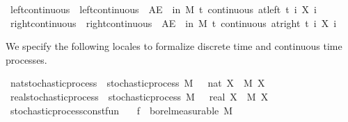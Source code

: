 \begin{isabellebody}
\isanewline
\isanewline
{}\isamarkupfalse%
\ left{\isacharunderscore}{\kern0pt}continuous\ \ {\isachardoublequoteopen}left{\isacharunderscore}{\kern0pt}continuous\ {\isacharequal}{\kern0pt}\ {\isacharparenleft}{\kern0pt}AE\ {\isasymxi}\ in\ M{\isachardot}{\kern0pt}\ {\isasymforall}t{\isachardot}{\kern0pt}\ continuous\ {\isacharparenleft}{\kern0pt}at{\isacharunderscore}{\kern0pt}left\ t{\isacharparenright}{\kern0pt}\ {\isacharparenleft}{\kern0pt}{\isasymlambda}i{\isachardot}{\kern0pt}\ X\ i\ {\isasymxi}{\isacharparenright}{\kern0pt}{\isacharparenright}{\kern0pt}{\isachardoublequoteclose}\isanewline
{}\isamarkupfalse%
\ right{\isacharunderscore}{\kern0pt}continuous\ \ {\isachardoublequoteopen}right{\isacharunderscore}{\kern0pt}continuous\ {\isacharequal}{\kern0pt}\ {\isacharparenleft}{\kern0pt}AE\ {\isasymxi}\ in\ M{\isachardot}{\kern0pt}\ {\isasymforall}t{\isachardot}{\kern0pt}\ continuous\ {\isacharparenleft}{\kern0pt}at{\isacharunderscore}{\kern0pt}right\ t{\isacharparenright}{\kern0pt}\ {\isacharparenleft}{\kern0pt}{\isasymlambda}i{\isachardot}{\kern0pt}\ X\ i\ {\isasymxi}{\isacharparenright}{\kern0pt}{\isacharparenright}{\kern0pt}{\isachardoublequoteclose}\isanewline
\isanewline
{}\isamarkupfalse%
%
\begin{isamarkuptext}%
We specify the following locales to formalize discrete time and continuous time processes.%
\end{isamarkuptext}\isamarkuptrue%
\isamarkupfalse%
\ nat{\isacharunderscore}{\kern0pt}stochastic{\isacharunderscore}{\kern0pt}process\ {\isacharequal}{\kern0pt}\ stochastic{\isacharunderscore}{\kern0pt}process\ M\ {\isachardoublequoteopen}{}\ {\isacharcolon}{\kern0pt}{\isacharcolon}{\kern0pt}\ nat{\isachardoublequoteclose}\ X\ \ M\ X\isanewline
{}\isamarkupfalse%
\ real{\isacharunderscore}{\kern0pt}stochastic{\isacharunderscore}{\kern0pt}process\ {\isacharequal}{\kern0pt}\ stochastic{\isacharunderscore}{\kern0pt}process\ M\ {\isachardoublequoteopen}{}\ {\isacharcolon}{\kern0pt}{\isacharcolon}{\kern0pt}\ real{\isachardoublequoteclose}\ X\ \ M\ X\isanewline
\isanewline
{}\isamarkupfalse%
\ stochastic{\isacharunderscore}{\kern0pt}process{\isacharunderscore}{\kern0pt}const{\isacharunderscore}{\kern0pt}fun{\isacharcolon}{\kern0pt}\isanewline
\ \ \ {\isachardoublequoteopen}f\ {\isasymin}\ borel{\isacharunderscore}{\kern0pt}measurable\ M{\isachardoublequoteclose}\isanewline

\end{isabellebody}
